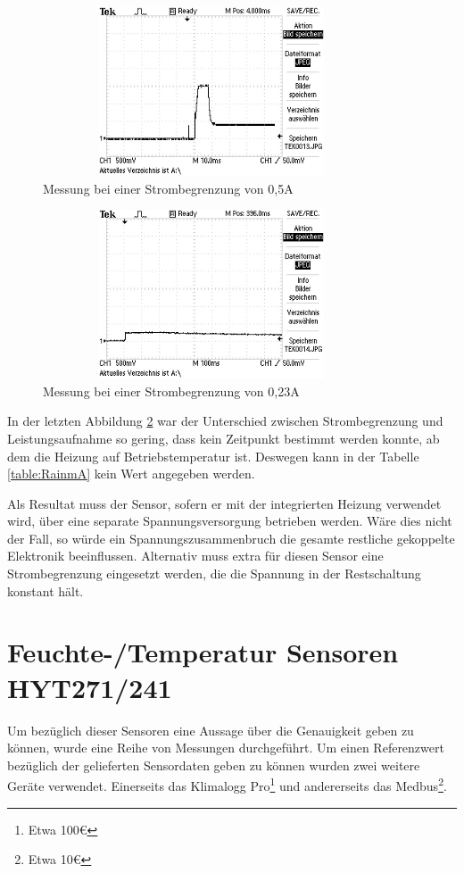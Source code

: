 		\begin{figure}[H]
		\centering
		\includegraphics[width=10cm,height=5cm]{./Grafiken/TEK0013}
		\caption{Messung bei einer Strombegrenzung von 0,5A}
		\label{fig:TEK0013}
		\end{figure}
		
		\begin{figure}[H]
		\centering
		\includegraphics[width=10cm,height=5cm]{./Grafiken/TEK0014}
		\caption{Messung bei einer Strombegrenzung von 0,23A}
		\label{fig:TEK0014}
		\end{figure}
		
		In der letzten Abbildung \ref{fig:TEK0014} war der Unterschied zwischen Strombegrenzung und Leistungsaufnahme so gering, dass kein Zeitpunkt bestimmt werden konnte, ab dem die Heizung auf Betriebstemperatur ist. Deswegen kann in der Tabelle \ref{table:RainmA} kein Wert angegeben werden.
		
		Als Resultat muss der Sensor, sofern er mit der integrierten Heizung verwendet wird, über eine separate Spannungsversorgung betrieben werden. Wäre dies nicht der Fall, so würde ein Spannungszusammenbruch die gesamte restliche gekoppelte Elektronik beeinflussen. Alternativ muss extra für diesen Sensor eine Strombegrenzung eingesetzt werden, die die Spannung in der Restschaltung konstant hält.
	\section{Feuchte-/Temperatur Sensoren HYT271/241}
		Um bezüglich dieser Sensoren eine Aussage über die Genauigkeit geben zu können, wurde eine Reihe von Messungen durchgeführt. Um einen Referenzwert bezüglich der gelieferten Sensordaten geben zu können wurden zwei weitere Geräte verwendet. Einerseits das Klimalogg Pro\footnote{Etwa 100\euro{}} und andererseits das Medbus\footnote{Etwa 10\euro{}}.
		
